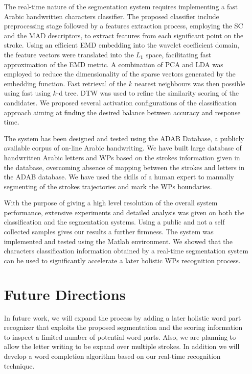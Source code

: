 The real-time nature of the segmentation system requires implementing a fast Arabic handwritten characters classifier.
The proposed classifier include preprocessing stage followed by a features extraction process, employing the SC and the MAD descriptors, to extract features from each significant point on the stroke.
Using an efficient EMD embedding into the wavelet coefficient domain, the feature vectors were translated into the $L_1$ space, facilitating fast approximation of the EMD metric.
A combination of PCA and LDA was employed to reduce the dimensionality of the sparse vectors generated by the embedding function.
Fast retrieval of the $k$ nearest neighbours was then possible using fast using $k$-d tree.
DTW was used to refine the similarity scoring of the candidates.
We proposed several activation configurations of the classification approach aiming at finding the desired balance between accuracy and response time.

The system has been designed and tested using the ADAB Database, a publicly available corpus of on-line Arabic handwriting.
We have built large database of handwritten Arabic letters and WPs based on the strokes information given in the database, overcoming absence of mapping between the strokes and letters in the ADAB database.
We have used the skills of a human expert to manually segmenting of the strokes trajectories and mark the WPs boundaries.

With the purpose of giving a high level resolution of the overall system performance, extensive experiments and detailed analysis was given on both the classification and the segmentation systems.
Using a public and not a self collected samples gives our results a further firmness.
The system was implemented and tested using the Matlab environment.
We showed that the characters classification information obtained by a real-time segmentation system can be used to significantly accelerate a later holistic WPs recognition process.


\newpage{}

\section{Future Directions}
\label{sec:future_directions}

In future work, we will expand the process by adding a later holistic word part recognizer that exploits the proposed segmentation and the scoring information to inspect a limited number of potential word parts.
Also, we are planning to allow the letter writing to be expand over multiple strokes.
In addition we will develop a word completion algorithm based on our real-time recognition technique.

